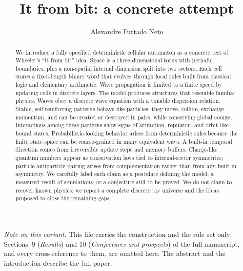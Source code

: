 \documentclass{ijuc}
\begin{document}
\title{It from bit: a concrete attempt}
\author{Alexandre Furtado Neto
}
\def\received{\today}
\maketitle
\begin{abstract}
\sloppy
We introduce a fully specified deterministic cellular automaton as a concrete test of Wheeler's ``it from bit'' idea. Space is a three-dimensional torus with periodic boundaries, plus a non-spatial internal dimension split into two sectors. Each cell stores a fixed-length binary word that evolves through local rules built from classical logic and elementary arithmetic. Wave propagation is limited to a finite speed by updating cells in discrete layers.
The model produces structures that resemble familiar physics. Waves obey a discrete wave equation with a tunable dispersion relation. Stable, self-reinforcing patterns behave like particles: they move, collide, exchange momentum, and can be created or destroyed in pairs, while conserving global counts. Interactions among these patterns show signs of attraction, repulsion, and orbit-like bound states. Probabilistic-looking behavior arises from deterministic rules because the finite state space can be coarse-grained in many equivalent ways. A built-in temporal direction comes from irreversible update steps and memory buffers. Charge-like quantum numbers appear as conservation laws tied to internal-sector symmetries; particle-antiparticle pairing arises from complementation rather than from any built-in asymmetry.
We carefully label each claim as a postulate defining the model, a measured result of simulations, or a conjecture still to be proved. We do not claim to recover known physics; we report a complete discrete toy universe and the ideas proposed to close the remaining gaps.
\medskip{}
\end{abstract}

\medskip
\noindent\textit{Note on this variant.}  This file carries the construction and the rule set only: Sections~9 (\textit{Results}) and 10 (\textit{Conjectures and prospects}) of the full manuscript, and every cross-reference to them, are omitted here.  The abstract and the introduction describe the full paper.
\end{document}
